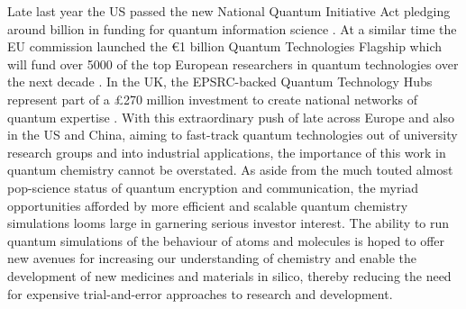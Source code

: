 \documentclass[12pt]{article}
\begin{document}
Late last year the US passed the new National Quantum Initiative Act pledging around  billion in funding for quantum information science
 \cite{usbill}. At a similar time the EU commission launched the €1 billion Quantum Technologies Flagship which will fund over 5000 of the top
 European researchers in quantum technologies over the next decade \cite{eubill}. In the UK, the EPSRC-backed Quantum Technology Hubs represent
 part of a £270 million investment to create national networks of quantum expertise \cite{ukbill}. With this extraordinary push of late across
 Europe and also in the US and China, aiming to fast-track quantum technologies out of university research groups and into industrial applications,
 the importance of this work in quantum chemistry cannot be overstated. As aside from the much touted almost pop-science status of
 quantum encryption and communication, the myriad opportunities afforded by more efficient and scalable quantum chemistry simulations looms large
 in garnering serious investor interest. The ability to run quantum simulations of the behaviour of atoms and molecules is hoped to offer new
 avenues for increasing our understanding of chemistry and enable the development of new medicines and materials in silico, thereby reducing
 the need for expensive trial-and-error approaches to research and development.





\end{document}
